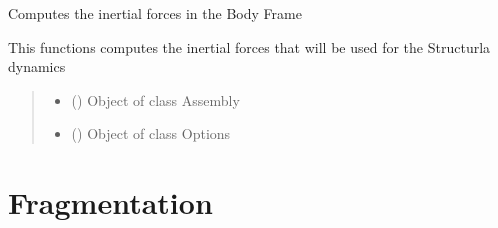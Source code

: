 \documentclass[letterpaper,10pt,english]{sphinxmanual}
\begin{document}
\begin{fulllineitems}
\label{\detokenize{modules:forces.compute_inertial_forces}}
\pysigstartsignatures
{}
\pysigstopsignatures
\sphinxAtStartPar
Computes the inertial forces in the Body Frame

\sphinxAtStartPar
This functions computes the inertial forces that will be used for the Structurla dynamics
\begin{quote}\begin{description}
\begin{itemize}
\item {} 
\sphinxAtStartPar
{} ({\hyperref[\detokenize{modules:assembly.Assembly}]{}}) \textendash{} Object of class Assembly

\item {} 
\sphinxAtStartPar
{} ({\hyperref[\detokenize{modules:configuration.Options}]{}}) \textendash{} Object of class Options

\end{itemize}

\end{description}\end{quote}

\end{fulllineitems}



\section{Fragmentation}
\label{\detokenize{modules:fragmentation}}
\end{document}
